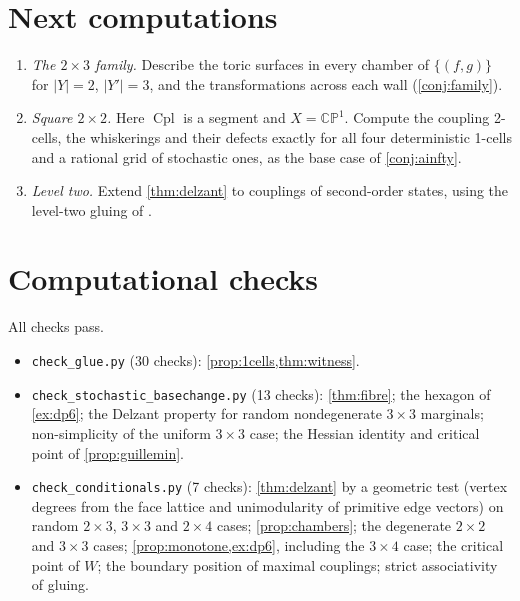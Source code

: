 \documentclass[11pt]{article}
\theoremstyle{definition}
\theoremstyle{remark}
\newcommand{\Cpl}{\operatorname{Cpl}}
\begin{document}
\section{Next computations}\label{sec:next}

\begin{enumerate}[label=(\arabic*),leftmargin=*]
\item \emph{The $2\times3$ family.} Describe the toric surfaces in every chamber of
  $\{(f,g)\}$ for $\lvert Y\rvert=2$, $\lvert Y'\rvert=3$, and the transformations across each wall
  (\cref{conj:family}).
\item \emph{Square $2\times2$.} Here $\Cpl$ is a segment and $X=\mathbb{CP}^1$. Compute the coupling
  2-cells, the whiskerings and their defects exactly for all four deterministic 1-cells and a
  rational grid of stochastic ones, as the base case of \cref{conj:ainfty}.
\item \emph{Level two.} Extend \cref{thm:delzant} to couplings of second-order states, using the
  level-two gluing of \cite[Prop.~7.16]{Awasthi-Attribution}.
\end{enumerate}

\section{Computational checks}\label{sec:code}

All checks pass.
\begin{itemize}[leftmargin=*]
\item \texttt{check\_glue.py} (30 checks): \cref{prop:1cells,thm:witness}.
\item \texttt{check\_stochastic\_basechange.py} (13 checks): \cref{thm:fibre}; the hexagon of
  \cref{ex:dp6}; the Delzant property for random nondegenerate $3\times3$ marginals; non-simplicity of
  the uniform $3\times3$ case; the Hessian identity and critical point of \cref{prop:guillemin}.
\item \texttt{check\_conditionals.py} (7 checks): \cref{thm:delzant} by a geometric test (vertex degrees
  from the face lattice and unimodularity of primitive edge vectors) on random $2\times3$, $3\times3$
  and $2\times4$ cases; \cref{prop:chambers}; the degenerate $2\times2$ and $3\times3$ cases;
  \cref{prop:monotone,ex:dp6}, including the $3\times4$ case; the critical point of $W$; the boundary
  position of maximal couplings; strict associativity of gluing.
\end{itemize}
\end{document}
